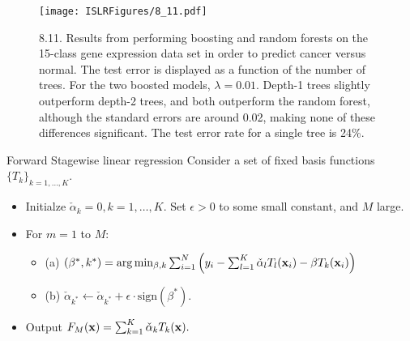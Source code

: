 \documentclass{beamer}
\def\bfx{{\bf x}}
\begin{document}
                       \begin{frame}
                       	\frametitle{}
                       	\begin{figure}
                       		\centering
                       		
                       		\centering
                       		\texttt{[image: ISLRFigures/8\_11.pdf]}
                       		\caption{\scriptsize 8.11. Results from performing boosting and random forests on the
                       			15-class gene expression data set in order to predict cancer versus normal. The
                       			test error is displayed as a function of the number of trees. For the two boosted
                       			models, $\lambda=0.01$. Depth-1 trees slightly outperform depth-2 trees, and both outperform
                       			the random forest, although the standard errors are around 0.02, making
                       			none of these differences significant. The test error rate for a single tree is 24\%.
                       		}
                       	\end{figure}
                       \end{frame}


                            \begin{frame}{Forward Stagewise linear regression}
                            Consider a set of fixed basis functions $\{T_k\}_{k=1,\dots,K}$. 
                            \begin{itemize}
                              \item Initialze $\check{\alpha}_k=0, k = 1, \dots, K$. Set $\epsilon>0$ to some small constant, and $M$ large.
                              \item For $m = 1$ to $M$:
                              \begin{itemize}
                                \item (a) $(\beta^*, k^*) = \arg\min_{\beta,k} \sum^N_{i=1} \left(y_i - \sum^K_{l=1} \check{\alpha}_l T_l(\bfx_i) -\beta T_k(\bfx_i)\right)$
                                \item (b) $\check{\alpha}_{k^*} \leftarrow \check{\alpha}_{k^*} + \epsilon \cdot \mathrm{sign}(\beta^*).$
                              \end{itemize}
                              \item Output $F_M(\bfx) = \sum^K_{k=1} \check{\alpha}_k T_k(\bfx).$
                            \end{itemize}
                            \end{frame}
\end{document}
